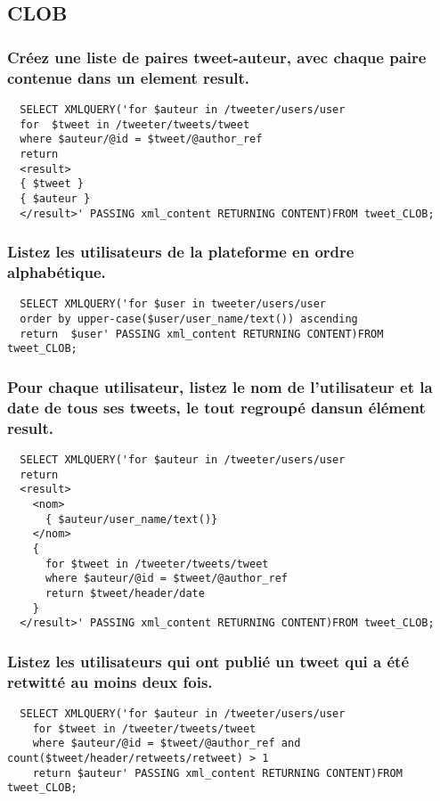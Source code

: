 \subsection{CLOB}
\subsubsection{Créez une liste de paires tweet-auteur, avec chaque paire contenue dans un element result.}
\begin{verbatim}
  SELECT XMLQUERY('for $auteur in /tweeter/users/user 
  for  $tweet in /tweeter/tweets/tweet
  where $auteur/@id = $tweet/@author_ref  
  return
  <result>
  { $tweet }
  { $auteur }
  </result>' PASSING xml_content RETURNING CONTENT)FROM tweet_CLOB;
\end{verbatim}

\subsubsection{Listez les utilisateurs de la plateforme en ordre alphabétique.}
\begin{verbatim}
  SELECT XMLQUERY('for $user in tweeter/users/user
  order by upper-case($user/user_name/text()) ascending
  return  $user' PASSING xml_content RETURNING CONTENT)FROM tweet_CLOB;
\end{verbatim}


\subsubsection{Pour chaque utilisateur, listez le nom de l’utilisateur et la date de tous ses tweets, le tout regroupé dansun élément result.}
\begin{verbatim}
  SELECT XMLQUERY('for $auteur in /tweeter/users/user
  return
  <result>
    <nom>
      { $auteur/user_name/text()}
    </nom> 
    {
      for $tweet in /tweeter/tweets/tweet
      where $auteur/@id = $tweet/@author_ref  
      return $tweet/header/date
    }
  </result>' PASSING xml_content RETURNING CONTENT)FROM tweet_CLOB;
\end{verbatim}

\subsubsection{Listez les utilisateurs qui ont publié un tweet qui a été retwitté au moins deux fois.}
\begin{verbatim}
  SELECT XMLQUERY('for $auteur in /tweeter/users/user
    for $tweet in /tweeter/tweets/tweet
    where $auteur/@id = $tweet/@author_ref and count($tweet/header/retweets/retweet) > 1
    return $auteur' PASSING xml_content RETURNING CONTENT)FROM tweet_CLOB;
\end{verbatim}

